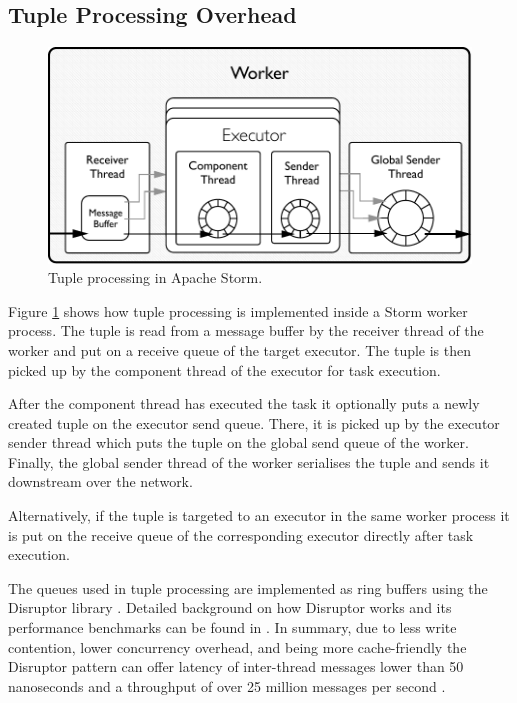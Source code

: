 \documentclass[bsc,deptreport,twoside,singlespacing,normalheadings,parskip]{infthesis}\usepackage[]{graphicx}\usepackage[]{color}
\begin{document}
\subsection{Tuple Processing Overhead}

\begin{figure}[!htb]
	\centering
	\includegraphics[scale=0.7]{pdf/worker_inside.pdf}
	\caption{Tuple processing in Apache Storm.}
	\label{fig:worker_inside}
\end{figure}

Figure \ref{fig:worker_inside} shows how tuple processing is implemented inside a Storm worker process. The tuple is read from a message buffer by the receiver thread of the worker and put on a receive queue of the target executor. The tuple is then picked up by the component thread of the executor for task execution.

After the component thread has executed the task it optionally puts a newly created tuple on the executor send queue. There, it is picked up by the executor sender thread which puts the tuple on the global send queue of the worker. Finally, the global sender thread of the worker serialises the tuple and sends it downstream over the network.

Alternatively, if the tuple is targeted to an executor in the same worker process it is put on the receive queue of the corresponding executor directly after task execution.

The queues used in tuple processing are implemented as ring buffers using the Disruptor library \citep{LMAXDisruptor}. Detailed background on how Disruptor works and its performance benchmarks can be found in \citep{Thompson_Farley_Barker_Gee_Stewart_2011}. In summary, due to less write contention, lower concurrency overhead, and being more cache-friendly the Disruptor pattern can offer latency of inter-thread messages lower than 50 nanoseconds and a throughput of over 25 million messages per second \cite{Thompson_Farley_Barker_Gee_Stewart_2011}.
\end{document}
